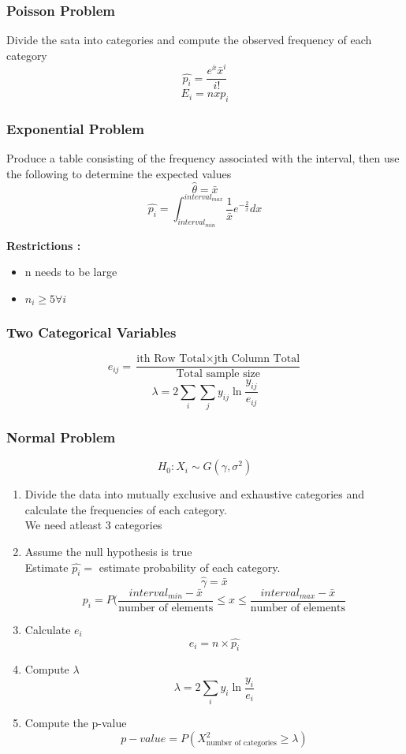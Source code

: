 \documentclass{article}
\begin{document}
\subsubsection*{Poisson Problem}
Divide the sata into categories and compute the observed frequency of each category
$$ \hat{p_i} = \frac{e^{\bar{x}} \bar{x}^i }{i!} $$ 
$$ E_i = n x p_i $$

\subsubsection*{Exponential Problem}
Produce a table consisting  of the frequency associated with the interval, then use the following to determine the expected values 
$$ \hat{\theta} = \bar{x} $$
$$ \hat{p_i} = \int_{interval_{min}}^{interval_{max}} \frac{1}{\bar{x}} e^{- \frac{2}{\bar{x}}} dx$$

\textbf{Restrictions :} 
\begin{itemize}
\item n needs to be large 
\item \(n_i \geq 5  \forall i\) 
\end{itemize}

\subsubsection*{Two Categorical Variables}
$$ e_{ij} = \frac{\text{ith Row Total} \times \text{jth Column Total}}{\text{Total sample size}}$$
$$ \lambda = 2 \sum_i \sum_j y_{ij} \ln \frac{y_{ij}}{e_{ij}}$$

\subsubsection*{Normal Problem}
$$ H_0 : X_i \sim G(\gamma, \sigma^2) $$
\begin{enumerate}
\item Divide the data into mutually exclusive and exhaustive categories and calculate the frequencies of each category.\\
We need atleast 3 categories
\item Assume the null hypothesis is true\\
Estimate \(\hat{p_i} = \) estimate probability of each category. 
$$ \hat{\gamma} = \bar{x} $$
$$ p_i = P(\frac{interval_{min} - \bar{x}}{\text{number of elements}} \leq x \leq  \frac{interval_{max} - \bar{x}}{\text{number of elements}}$$
\item Calculate \(e_i\)
$$ e_i = n \times \hat{p_i} $$
\item Compute \(\lambda\)
$$ \lambda = 2 \sum_i y_{i} \ln \frac{y_{i}}{e_{i}}$$
\item Compute the p-value 
$$ p-value = P(X^2 _{\text{number of categories}} \geq \lambda) $$
\end{enumerate}
\end{document}
